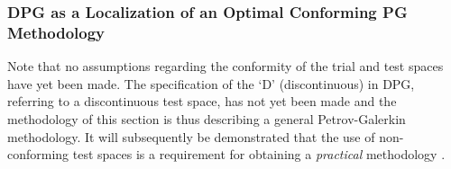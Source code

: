 \subsubsection{DPG as a Localization of an Optimal Conforming PG Methodology}

Note that no assumptions regarding the conformity of the trial and test spaces have yet been made. The specification of
the `D' (discontinuous) in DPG, referring to a discontinuous test space, has not yet been made and the methodology of
this section is thus describing a general Petrov-Galerkin methodology. It will subsequently be demonstrated that the
use of non-conforming test spaces is a requirement for obtaining a \emph{practical} methodology .

